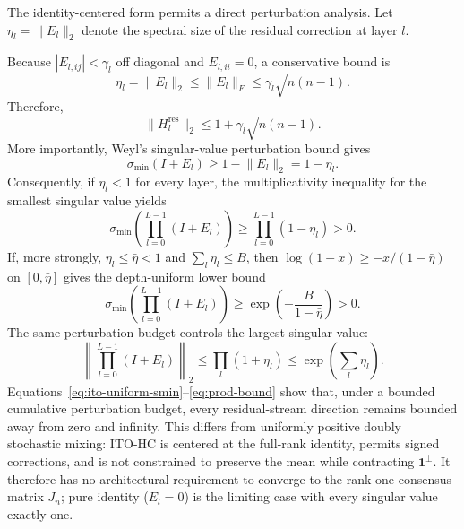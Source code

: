 \documentclass{article}
\newcommand{\Hres}{H^{\mathrm{res}}}
\newcommand{\norm}[1]{\lVert #1\rVert}
\begin{document}
The identity-centered form permits a direct perturbation analysis. Let $\eta_l=\norm{E_l}_2$ denote the spectral size of the residual correction at layer $l$.

Because $|E_{l,ij}|<\gamma_l$ off diagonal and $E_{l,ii}=0$, a conservative bound is
\begin{equation}
 \eta_l=\norm{E_l}_2\leq\norm{E_l}_F\leq\gamma_l\sqrt{n(n-1)}.
 \label{eq:ef}
\end{equation}
Therefore,
\begin{equation}
 \norm{\Hres_l}_2\leq1+\gamma_l\sqrt{n(n-1)}.
 \label{eq:hbound}
\end{equation}
More importantly, Weyl's singular-value perturbation bound gives
\begin{equation}
 \sigma_{\min}(I+E_l)\geq1-\norm{E_l}_2=1-\eta_l.
 \label{eq:ito-layer-smin}
\end{equation}
Consequently, if $\eta_l<1$ for every layer, the multiplicativity inequality for the smallest singular value yields
\begin{equation}
 \sigma_{\min}\!\left(\prod_{l=0}^{L-1}(I+E_l)\right)
 \geq\prod_{l=0}^{L-1}(1-\eta_l)>0.
 \label{eq:ito-product-smin}
\end{equation}
If, more strongly, $\eta_l\leq\bar\eta<1$ and $\sum_l\eta_l\leq B$, then $\log(1-x)\geq-x/(1-\bar\eta)$ on $[0,\bar\eta]$ gives the depth-uniform lower bound
\begin{equation}
 \sigma_{\min}\!\left(\prod_{l=0}^{L-1}(I+E_l)\right)
 \geq \exp\!\left(-\frac{B}{1-\bar\eta}\right)>0.
 \label{eq:ito-uniform-smin}
\end{equation}
The same perturbation budget controls the largest singular value:
\begin{equation}
 \left\|\prod_{l=0}^{L-1}(I+E_l)\right\|_2
 \leq\prod_l(1+\eta_l)\leq\exp\left(\sum_l\eta_l\right).
 \label{eq:prod-bound}
\end{equation}
Equations~\ref{eq:ito-uniform-smin}--\ref{eq:prod-bound} show that, under a bounded cumulative perturbation budget, every residual-stream direction remains bounded away from zero and infinity. This differs from uniformly positive doubly stochastic mixing: ITO-HC is centered at the full-rank identity, permits signed corrections, and is not constrained to preserve the mean while contracting $\mathbf 1^\perp$. It therefore has no architectural requirement to converge to the rank-one consensus matrix $J_n$; pure identity ($E_l=0$) is the limiting case with every singular value exactly one.
\end{document}
